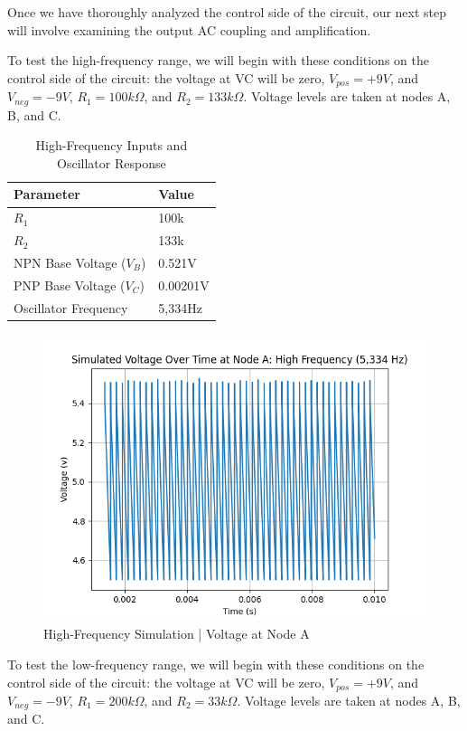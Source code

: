 \documentclass{article}
\begin{document}
Once we have thoroughly analyzed the control side of the circuit, our next step will involve examining the output AC coupling and amplification.

To test the high-frequency range, we will begin with these conditions on the control side of the circuit: the voltage at VC will be zero, $V_{pos} = +9 V$, and $V_{neg} = -9 V$, $R_1 = 100k \Omega$, and $R_2 = 133k \Omega$. Voltage levels are taken at nodes A, B, and C.

\begin{table}[H]
  \centering
  \begin{tabular}{ll}
    \toprule
    Parameter & Value \\
    \midrule
    $R_1$ & 100k \\
    $R_2$ & 133k \\
    NPN Base Voltage ($V_B$) & 0.521V \\
    PNP Base Voltage ($V_C$) & 0.00201V \\
    Oscillator Frequency & 5,334Hz \\
    \bottomrule
  \end{tabular}
  \caption{High-Frequency Inputs and Oscillator Response}
\end{table}
\vspace{-1.5cm}
\begin{figure}[H]
  \centering
  \includegraphics[width=.7\linewidth]{png/Figure_1.png}
  \caption{High-Frequency Simulation | Voltage at Node A}
\end{figure}

To test the low-frequency range, we will begin with these conditions on the control side of the circuit: the voltage at VC will be zero, $V_{pos} = +9 V$, and $V_{neg} = -9 V$, $R_1 = 200k \Omega$, and $R_2 = 33k \Omega$. Voltage levels are taken at nodes A, B, and C.
\end{document}
